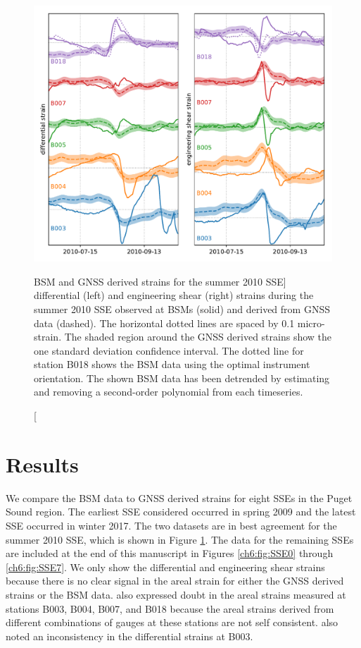 \begin{figure}
\includegraphics{ch6/figures/SSE1.pdf}
\caption
[BSM and GNSS derived strains for the summer 2010 SSE]
{differential (left) and engineering shear (right) strains
during the summer 2010 SSE observed at BSMs (solid) and derived from
GNSS data (dashed). The horizontal dotted lines are spaced by 0.1
micro-strain. The shaded region around the GNSS derived strains show
the one standard deviation confidence interval. The dotted line for
station B018 shows the BSM data using the optimal instrument
orientation. The shown BSM data has been detrended by estimating and
removing a second-order polynomial from each timeseries.}
\label{ch6:fig:SSE1}
\end{figure}

\section{Results}
We compare the BSM data to GNSS derived strains for eight SSEs in the
Puget Sound region. The earliest SSE considered occurred in spring
2009 and the latest SSE occurred in winter 2017. The two datasets are
in best agreement for the summer 2010 SSE, which is shown in Figure
\ref{ch6:fig:SSE1}. The data for the remaining SSEs are included at the
end of this manuscript in Figures \ref{ch6:fig:SSE0} through
\ref{ch6:fig:SSE7}. We only show the differential and engineering shear
strains because there is no clear signal in the areal strain for
either the GNSS derived strains or the BSM data. \citet{Roeloffs2010}
also expressed doubt in the areal strains measured at stations B003,
B004, B007, and B018 because the areal strains derived from different
combinations of gauges at these stations are not self consistent.
\citet{Roeloffs2010} also noted an inconsistency in the differential
strains at B003.

